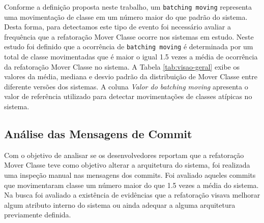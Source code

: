 \documentclass[12pt]{article}
\begin{document}
Conforme a definição proposta neste trabalho, um  \texttt{batching moving} representa uma movimentação de classe em um número maior do que padrão do sistema. Desta forma, para detectamos este tipo de evento foi necessário avaliar a frequência que a refatoração Mover Classe ocorre nos sistemas em estudo. Neste estudo foi definido que a ocorrência de \texttt{batching moving} é determinada por um total de classe movimentadas que é maior o igual 1.5 vezes a média de ocorrência da refatoração Mover Classe no sistema.  A Tabela \ref{tab:visao-geral} exibe os valores da média, mediana e desvio padrão da distribuição de Mover Classe entre diferente versões dos sistemas. A coluna \textit{Valor do batching moving} apresenta o valor de referência utilizado para detectar movimentações de classes atípicas no sistema.
\begin{table}[]
	\centering
	\caption{Media, Mediana, Desvio Padrão e Valor do batching moving}
	\label{tab:visao-geral}
\end{table}



\subsection{Análise das Mensagens de Commit}
\label{subsec:analise_commit}

Com o objetivo de analisar se os desenvolvedores reportam que a refatoração Mover Classe teve como objetivo alterar a arquitetura do sistema, foi realizada uma inspeção manual nas mensagens dos commits. Foi avaliado aqueles commits que movimentaram classe um número maior do que 1.5 vezes a média do sistema. Na busca foi avaliado a existência de evidências que a refatoração visava melhorar algum atributo interno do sistema ou ainda adequar a alguma arquitetura previamente definida. 
\end{document}
